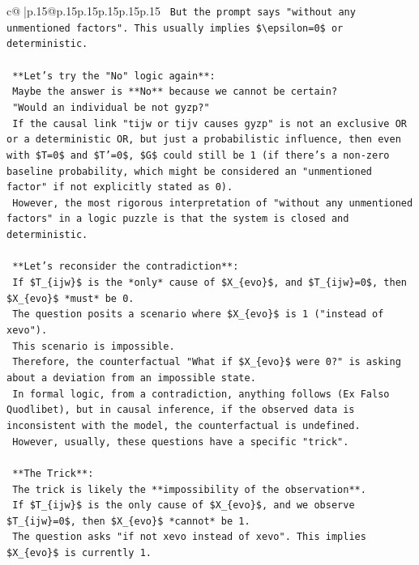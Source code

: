 \documentclass{article}
\begin{document}
{\begin{supertabular}{c@{$\;$}|p{.15\linewidth}@{}p{.15\linewidth}p{.15\linewidth}p{.15\linewidth}p{.15\linewidth}p{.15\linewidth}}
{{{\texttt{    But the prompt says "without any unmentioned factors". This usually implies \$\textbackslash{}epsilon=0\$ or deterministic.} \\
\\ 
\texttt{    **Let's try the "No" logic again**:} \\
\texttt{    Maybe the answer is **No** because we cannot be certain?} \\
\texttt{    "Would an individual be not gyzp?"} \\
\texttt{    If the causal link "tijw or tijv causes gyzp" is not an exclusive OR or a deterministic OR, but just a probabilistic influence, then even with \$T=0\$ and \$T'=0\$, \$G\$ could still be 1 (if there's a non{-}zero baseline probability, which might be considered an "unmentioned factor" if not explicitly stated as 0).} \\
\texttt{    However, the most rigorous interpretation of "without any unmentioned factors" in a logic puzzle is that the system is closed and deterministic.} \\
\\ 
\texttt{    **Let's reconsider the contradiction**:} \\
\texttt{    If \$T\_\{ijw\}\$ is the *only* cause of \$X\_\{evo\}\$, and \$T\_\{ijw\}=0\$, then \$X\_\{evo\}\$ *must* be 0.} \\
\texttt{    The question posits a scenario where \$X\_\{evo\}\$ is 1 ("instead of xevo").} \\
\texttt{    This scenario is impossible.} \\
\texttt{    Therefore, the counterfactual "What if \$X\_\{evo\}\$ were 0?" is asking about a deviation from an impossible state.} \\
\texttt{    In formal logic, from a contradiction, anything follows (Ex Falso Quodlibet), but in causal inference, if the observed data is inconsistent with the model, the counterfactual is undefined.} \\
\texttt{    However, usually, these questions have a specific "trick".} \\
\\ 
\texttt{    **The Trick**:} \\
\texttt{    The trick is likely the **impossibility of the observation**.} \\
\texttt{    If \$T\_\{ijw\}\$ is the only cause of \$X\_\{evo\}\$, and we observe \$T\_\{ijw\}=0\$, then \$X\_\{evo\}\$ *cannot* be 1.} \\
\texttt{    The question asks "if not xevo instead of xevo". This implies \$X\_\{evo\}\$ is currently 1.} \\
}}}
\end{supertabular}}
\end{document}
